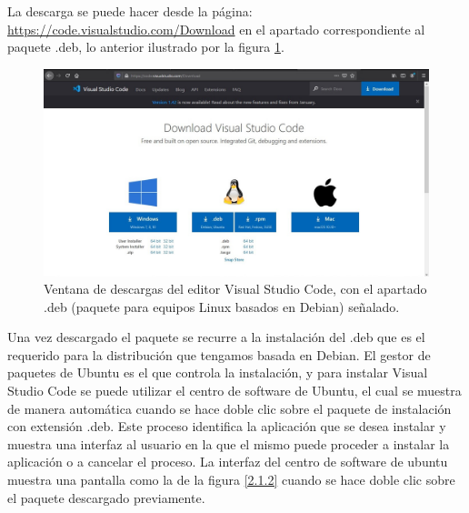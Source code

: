 {{\noindent La descarga se puede hacer desde la página:
\hyperlink{https://code.visualstudio.com/Download}{https://code.visualstudio.com/Download} en el apartado correspondiente al paquete .deb, lo anterior ilustrado por la figura \ref{2.1.1}.

\begin{figure}[H]
    \centering
    \includegraphics[scale=0.5]{Capitulo4/Documentos/imagenes_entorno/figura2-1-1.jpg}
    \caption{Ventana de descargas del editor Visual Studio Code, con el apartado .deb (paquete para equipos Linux basados en Debian) señalado.}
    \label{2.1.1}
\end{figure}

\noindent Una vez descargado el paquete se recurre a la instalación del .deb que es el requerido para la distribución que tengamos basada en Debian.  El gestor de paquetes de Ubuntu es el que controla la instalación, y para instalar Visual Studio Code se puede utilizar el centro de software de Ubuntu, el cual se muestra de manera automática cuando se hace doble clic sobre el paquete de instalación con extensión .deb. Este proceso identifica la aplicación que se desea instalar y muestra una interfaz al usuario en la que el mismo puede proceder a instalar la aplicación o a cancelar el proceso. La interfaz del centro de software de ubuntu muestra una pantalla como la de la figura \ref{2.1.2} cuando se hace doble clic sobre el paquete descargado previamente.

}}
